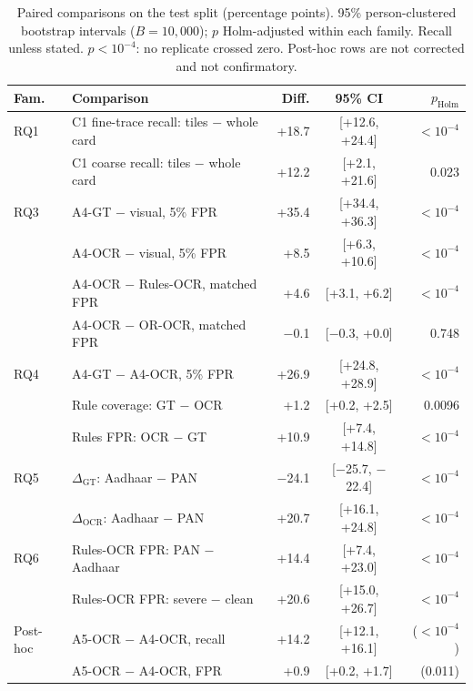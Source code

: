 \begin{table}[!t]
\caption{Paired comparisons on the test split (percentage points). 95\% person-clustered bootstrap intervals ($B=10{,}000$); $p$ Holm-adjusted within each family. Recall unless stated. $p<10^{-4}$: no replicate crossed zero. Post-hoc rows are not corrected and not confirmatory.}
\label{tab:tests}
\centering
\scriptsize
\setlength{\tabcolsep}{2.4pt}
\renewcommand{\arraystretch}{1.06}
\begin{tabular}{@{}l l r c r@{}}
\toprule
Fam. & Comparison & Diff. & 95\% CI & $p_{\mathrm{Holm}}$ \\
\midrule
RQ1 & C1 fine-trace recall: tiles $-$ whole card & +18.7 & [+12.6, +24.4] & $<\!10^{-4}$ \\
 & C1 coarse recall: tiles $-$ whole card & +12.2 & [+2.1, +21.6] & 0.023 \\
\addlinespace[1.5pt]
RQ3 & A4-GT $-$ visual, 5\% FPR & +35.4 & [+34.4, +36.3] & $<\!10^{-4}$ \\
 & A4-OCR $-$ visual, 5\% FPR & +8.5 & [+6.3, +10.6] & $<\!10^{-4}$ \\
 & A4-OCR $-$ Rules-OCR, matched FPR & +4.6 & [+3.1, +6.2] & $<\!10^{-4}$ \\
 & A4-OCR $-$ OR-OCR, matched FPR & $-$0.1 & [$-$0.3, +0.0] & 0.748 \\
\addlinespace[1.5pt]
RQ4 & A4-GT $-$ A4-OCR, 5\% FPR & +26.9 & [+24.8, +28.9] & $<\!10^{-4}$ \\
 & Rule coverage: GT $-$ OCR & +1.2 & [+0.2, +2.5] & 0.0096 \\
 & Rules FPR: OCR $-$ GT & +10.9 & [+7.4, +14.8] & $<\!10^{-4}$ \\
\addlinespace[1.5pt]
RQ5 & $\Delta_{\mathrm{GT}}$: Aadhaar $-$ PAN & $-$24.1 & [$-$25.7, $-$22.4] & $<\!10^{-4}$ \\
 & $\Delta_{\mathrm{OCR}}$: Aadhaar $-$ PAN & +20.7 & [+16.1, +24.8] & $<\!10^{-4}$ \\
\addlinespace[1.5pt]
RQ6 & Rules-OCR FPR: PAN $-$ Aadhaar & +14.4 & [+7.4, +23.0] & $<\!10^{-4}$ \\
 & Rules-OCR FPR: severe $-$ clean & +20.6 & [+15.0, +26.7] & $<\!10^{-4}$ \\
\midrule
Post-hoc & A5-OCR $-$ A4-OCR, recall & +14.2 & [+12.1, +16.1] & ($<\!10^{-4}$) \\
 & A5-OCR $-$ A4-OCR, FPR & +0.9 & [+0.2, +1.7] & (0.011) \\
\bottomrule
\end{tabular}
\end{table}
